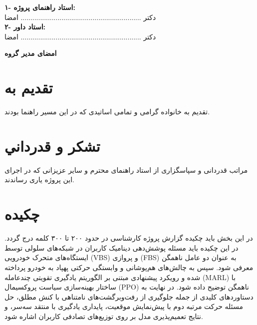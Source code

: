 \documentclass[a4paper,12pt,oneside]{report}
\begin{document}
\noindent
\textbf{۱- استاد راهنمای پروژه:}\\
دکتر .............................................................. \hfill امضا\\[1.2cm]
\textbf{۲- استاد داور:}\\
دکتر .............................................................. \hfill امضا\\[2cm]

\begin{center}
    \textbf{امضای مدیر گروه}
\end{center}
\newpage

\pagestyle{plain}

\chapter*{تقديم به}
\begin{center}
    \vspace*{4cm}
    {\large تقدیم به خانواده گرامی و تمامی اساتیدی که در این مسیر راهنما بودند.}
\end{center}
\newpage

\chapter*{تشکر و قدرداني}
مراتب قدردانی و سپاسگزاری از استاد راهنمای محترم و سایر عزیزانی که در اجرای این پروژه یاری رساندند.
\newpage

\chapter*{چکیده}
در این بخش باید چکیده گزارش پروژه کارشناسی در حدود ۲۰۰ تا ۳۰۰ کلمه درج گردد. در این چکیده باید مسئله پوشش‌دهی دینامیک کاربران در شبکه‌های سلولی توسط ایستگاه‌های متحرک خودرویی (\gls{VBS}) و پروازی (\gls{FBS}) به عنوان دو عامل ناهمگن معرفی شود. سپس به چالش‌های هم‌پوشانی و وابستگی حرکتی پهپاد به خودرو پرداخته شده و رویکرد پیشنهادی مبتنی بر الگوریتم یادگیری تقویتی چندعامله (\gls{MARL}) با ساختار بهینه‌سازی سیاست پروکسیمال (\gls{PPO}) ناهمگن توضیح داده شود. در نهایت به دستاوردهای کلیدی از جمله جلوگیری از رفت‌وبرگشت‌های نامتناهی با کنش مطلق، حل مسئله حرکت مرتبه دوم با پیش‌نمایش موقعیت، پایداری یادگیری با منتقد سه‌سر، و نتایج تعمیم‌پذیری مدل بر روی توزیع‌های تصادفی کاربران اشاره شود.
\end{document}
